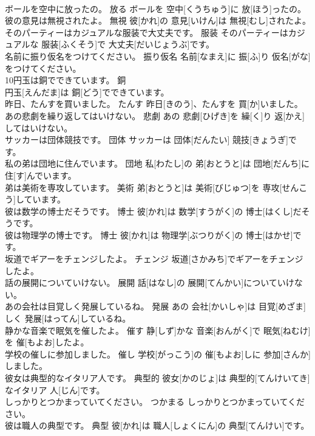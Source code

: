 \documentclass[8pt]{extreport}
\begin{document}
\begin{CJK}{UTF8}{min}
\\	ボールを空中に放ったの。	放る	ボールを 空中[くうちゅう]に 放[ほう]ったの。	
\\	彼の意見は無視されたよ。	無視	彼[かれ]の 意見[いけん]は 無視[むし]されたよ。	
\\	そのパーティーはカジュアルな服装で大丈夫です。	服装	そのパーティーはカジュアルな 服装[ふくそう]で 大丈夫[だいじょうぶ]です。	
\\	名前に振り仮名をつけてください。	振り仮名	名前[なまえ]に 振[ふ]り 仮名[がな]をつけてください。	
\\	10円玉は銅でできています。	銅	
\\	円玉[えんだま]は 銅[どう]でできています。	
\\	昨日、たんすを買いました。	たんす	昨日[きのう]、たんすを 買[か]いました。	
\\	あの悲劇を繰り返してはいけない。	悲劇	あの 悲劇[ひげき]を 繰[く]り 返[かえ]してはいけない。	
\\	サッカーは団体競技です。	団体	サッカーは 団体[だんたい] 競技[きょうぎ]です。	
\\	私の弟は団地に住んでいます。	団地	私[わたし]の 弟[おとうと]は 団地[だんち]に 住[す]んでいます。	
\\	弟は美術を専攻しています。	美術	弟[おとうと]は 美術[びじゅつ]を 専攻[せんこう]しています。	
\\	彼は数学の博士だそうです。	博士	彼[かれ]は 数学[すうがく]の 博士[はくし]だそうです。	
\\	彼は物理学の博士です。	博士	彼[かれ]は 物理学[ぶつりがく]の 博士[はかせ]です。	
\\	坂道でギアーをチェンジしたよ。	チェンジ	坂道[さかみち]でギアーをチェンジしたよ。	
\\	話の展開についていけない。	展開	話[はなし]の 展開[てんかい]についていけない。	
\\	あの会社は目覚しく発展しているね。	発展	あの 会社[かいしゃ]は 目覚[めざま]しく 発展[はってん]しているね。	
\\	静かな音楽で眠気を催したよ。	催す	静[しず]かな 音楽[おんがく]で 眠気[ねむけ]を 催[もよお]したよ。	
\\	学校の催しに参加しました。	催し	学校[がっこう]の 催[もよお]しに 参加[さんか]しました。	
\\	彼女は典型的なイタリア人です。	典型的	彼女[かのじょ]は 典型的[てんけいてき]なイタリア 人[じん]です。	
\\	しっかりとつかまっていてください。	つかまる	しっかりとつかまっていてください。	
\\	彼は職人の典型です。	典型	彼[かれ]は 職人[しょくにん]の 典型[てんけい]です。	

\end{CJK}
\end{document}
